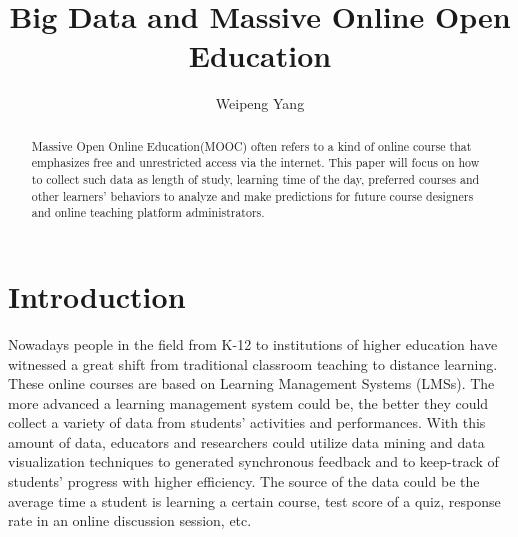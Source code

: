 \documentclass[sigconf]{acmart}
\begin{document}
\title{Big Data and Massive Online Open Education}

\author{Weipeng Yang}



\begin{abstract}
Massive Open Online Education(MOOC) often refers to a kind of online course that emphasizes free and unrestricted access via the internet. This paper will focus on how to collect such data as length of study, learning time of the day, preferred courses and other learners' behaviors to analyze and make predictions for future course designers and online teaching platform administrators.
\end{abstract}


\maketitle

\section{Introduction}

Nowadays people in the field from K-12 to institutions of higher education have witnessed a great shift from traditional classroom teaching to distance learning. These online courses are based on Learning Management Systems (LMSs). The more advanced a learning management system could be, the better they could collect a variety of data from students' activities and performances. \cite{Cormier2010} With this amount of data, educators and researchers could utilize data mining and data visualization techniques to generated synchronous feedback and to keep-track of students' progress with higher efficiency. The source of the data could be the average time a student is learning a certain course, test score of a quiz, response rate in an online discussion session, etc. \cite{Klobas2010}
\end{document}
